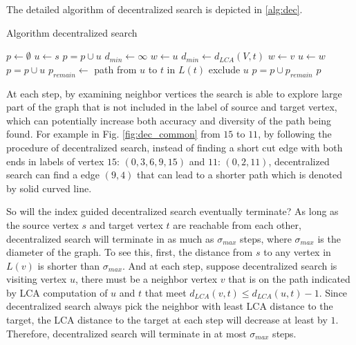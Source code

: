 The detailed algorithm of decentralized search is depicted in \ref{alg:dec}.

\begin{algorithm}
    \caption{Algorithm decentralized search}
		\label{alg:dec}
    \begin{algorithmic}
					\State $p \gets \emptyset$
					\State $u \gets s$
					\State $p = p \cup u$
						\State $d_{min} \gets \infty$
						\State $w \gets u$
						\For{each $v$ adjecent to $u$}
							\If{$d_{LCA}(v,t) < d_{min}$}
								\State $d_{min} \gets d_{LCA}(V,t)$
								\State $w \gets v$ 
							\EndIf
						\EndFor
						\State $u \gets w$
						\State $p = p \cup u$
					\EndWhile
					\State $p_{remain} \gets$ path from $u$ to $t$ in $L(t)$ exclude $u$
					\State $p = p \cup p_{remain}$
					\State \Return $p$
        \EndFunction
    \end{algorithmic}
\end{algorithm}

At each step, by examining neighbor vertices the search is able to explore large part of the graph that is not included in the label of source and target vertex, which can potentially increase both accuracy and diversity of the path being found. For example in Fig. \ref{fig:dec_common} from $15$ to $11$, by following the procedure of decentralized search, instead of finding a short cut edge with both ends in labels of vertex $15$: $(0, 3, 6, 9, 15)$ and $11$: $(0, 2, 11)$, decentralized search can find a edge $(9, 4)$ that can lead to a shorter path which is denoted by solid curved line. 

So will the index guided decentralized search eventually terminate? As long as the source vertex $s$ and target vertex $t$ are reachable from each other, decentralized search will terminate in as much as ${\sigma}_{max}$ steps, where ${\sigma}_{max}$ is the diameter of the graph. To see this, first, the distance from $s$ to any vertex in $L(v)$ is shorter than ${\sigma}_{max}$. And at each step, suppose decentralized search is visiting vertex $u$, there must be a neighbor vertex $v$ that is on the path indicated by LCA computation of $u$ and $t$ that meet $d_{LCA}(v,t) \leq d_{LCA}(u,t) - 1$. Since decentralized search always pick the neighbor with least LCA distance to the target, the LCA distance to the target at each step will decrease at least by $1$. Therefore, decentralized search will terminate in at most ${\sigma}_{max}$ steps. 

